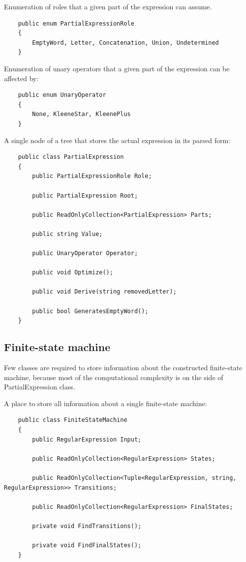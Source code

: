 \documentclass{article}
\begin{document}
Enumeration of roles that a given part of the expression can assume.

\begin{verbatim}
	public enum PartialExpressionRole
	{
		EmptyWord, Letter, Concatenation, Union, Undetermined
	}
\end{verbatim}

Enumeration of unary operators that a given part of the expression can be affected by:

\begin{verbatim}
	public enum UnaryOperator
	{
		None, KleeneStar, KleenePlus
	}
\end{verbatim}

A single node of a tree that stores the actual expression in its parsed form:

\begin{verbatim}
	public class PartialExpression
	{
		public PartialExpressionRole Role;

		public PartialExpression Root;

		public ReadOnlyCollection<PartialExpression> Parts;

		public string Value;

		public UnaryOperator Operator;

		public void Optimize();

		public void Derive(string removedLetter);

		public bool GeneratesEmptyWord();
	}
\end{verbatim}

\subsection{Finite-state machine}
Few classes are required to store information about the constructed finite-state machine, because
most of the computational complexity is on the side of PartialExpression class.

A place to store all information about a single finite-state machine:

\begin{verbatim}
	public class FiniteStateMachine
	{
		public RegularExpression Input;

		public ReadOnlyCollection<RegularExpression> States;

		public ReadOnlyCollection<Tuple<RegularExpression, string, RegularExpression>> Transitions;

		public ReadOnlyCollection<RegularExpression> FinalStates;

		private void FindTransitions();

		private void FindFinalStates();
	}
\end{verbatim}
\end{document}
